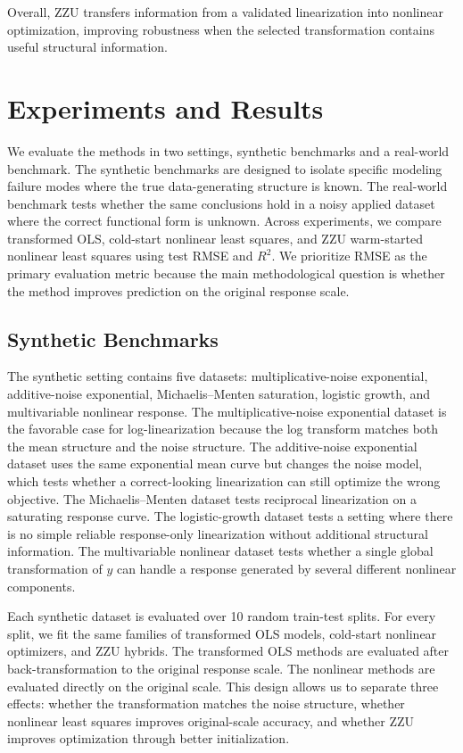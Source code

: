 \documentclass[11pt]{article}
\begin{document}
Overall, ZZU transfers information from a validated linearization into nonlinear optimization, improving robustness when the selected transformation contains useful structural information.

\section{Experiments and Results}
\label{experiments}
We evaluate the methods in two settings, synthetic benchmarks and a real-world benchmark. The synthetic benchmarks are designed to isolate specific modeling failure modes where the true data-generating structure is known. The real-world benchmark tests whether the same conclusions hold in a noisy applied dataset where the correct functional form is unknown. Across experiments, we compare transformed OLS, cold-start nonlinear least squares, and ZZU warm-started nonlinear least squares using test RMSE and \(R^2\). We prioritize RMSE as the primary evaluation metric because the main methodological question is whether the method improves prediction on the original response scale.

\subsection{Synthetic Benchmarks}

The synthetic setting contains five datasets: multiplicative-noise exponential, additive-noise exponential, Michaelis--Menten saturation, logistic growth, and multivariable nonlinear response. The multiplicative-noise exponential dataset is the favorable case for log-linearization because the log transform matches both the mean structure and the noise structure. The additive-noise exponential dataset uses the same exponential mean curve but changes the noise model, which tests whether a correct-looking linearization can still optimize the wrong objective. The Michaelis--Menten dataset tests reciprocal linearization on a saturating response curve. The logistic-growth dataset tests a setting where there is no simple reliable response-only linearization without additional structural information. The multivariable nonlinear dataset tests whether a single global transformation of \(y\) can handle a response generated by several different nonlinear components.

Each synthetic dataset is evaluated over 10 random train-test splits. For every split, we fit the same families of transformed OLS models, cold-start nonlinear optimizers, and ZZU hybrids. The transformed OLS methods are evaluated after back-transformation to the original response scale. The nonlinear methods are evaluated directly on the original scale. This design allows us to separate three effects: whether the transformation matches the noise structure, whether nonlinear least squares improves original-scale accuracy, and whether ZZU improves optimization through better initialization.
\end{document}
